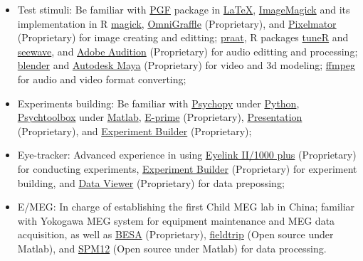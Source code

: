 \documentclass[12pt,]{article}
\providecommand{\tightlist}{%
  \setlength{\itemsep}{0pt}\setlength{\parskip}{0pt}}
\begin{document}
\begin{itemize}
\tightlist
\item
  Test stimuli: Be familiar with
  \href{https://ctan.org/pkg/pgf?lang=en}{PGF} package in
  \href{https://www.latex-project.org}{LaTeX},
  \href{https://imagemagick.org}{ImageMagick} and its implementation in
  R
  \href{https://cran.r-project.org/web/packages/magick/index.html}{magick},
  \href{https://www.omnigroup.com/omnigraffle/}{OmniGraffle}
  (Proprietary), and \href{https://www.pixelmator.com}{Pixelmator}
  (Proprietary) for image creating and editting;
  \href{http://www.fon.hum.uva.nl/praat/}{praat}, R packages
  \href{https://cran.r-project.org/web/packages/tuneR/index.html}{tuneR}
  and \href{https://cran.r-project.org/package=seewave}{seewave}, and
  \href{https://www.adobe.com/products/audition.html}{Adobe Audition}
  (Proprietary) for audio editting and processing;
  \href{https://www.blender.org}{blender} and
  \href{https://www.autodesk.com/products/maya/overview}{Autodesk Maya}
  (Proprietary) for video and 3d modeling;
  \href{https://ffmpeg.org}{ffmpeg} for audio and video format
  converting;
\item
  Experiments building: Be familiar with
  \href{http://www.psychopy.org}{Psychopy} under
  \href{https://www.python.org}{Python},
  \href{http://psychtoolbox.org}{Psychtoolbox} under
  \href{https://www.mathworks.com/products/matlab.html}{Matlab},
  \href{https://www.pstnet.com/eprime.cfm}{E-prime} (Proprietary),
  \href{https://www.neurobs.com/presentation}{Presentation}
  (Proprietary), and
  \href{https://www.sr-research.com/experiment-builder/}{Experiment
  Builder} (Proprietary);
\item
  Eye-tracker: Advanced experience in using
  \href{https://www.sr-research.com}{Eyelink II/1000 plus} (Proprietary)
  for conducting experiments,
  \href{https://www.sr-research.com/experiment-builder/}{Experiment
  Builder} (Proprietary) for experiment building, and
  \href{https://www.sr-research.com/data-viewer/}{Data Viewer}
  (Proprietary) for data prepossing;
\item
  E/MEG: In charge of establishing the first Child MEG lab in China;
  familiar with Yokogawa MEG system for equipment maintenance and MEG
  data acquisition, as well as \href{http://www.besa.de}{BESA}
  (Proprietary), \href{http://www.fieldtriptoolbox.org}{fieldtrip} (Open
  source under Matlab), and
  \href{https://github.com/neurodebian/spm12}{SPM12} (Open source under
  Matlab) for data processing.
\end{itemize}
\end{document}
